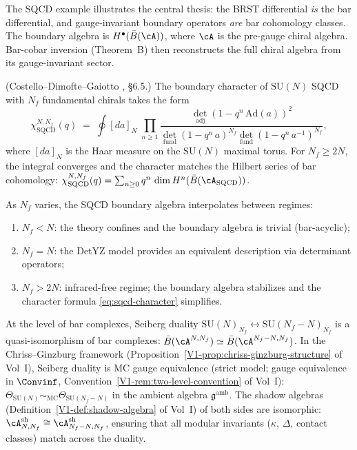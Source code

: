 \begin{remark}
The SQCD example illustrates the central thesis: the BRST differential
\emph{is} the bar differential, and gauge-invariant boundary operators
\emph{are} bar cohomology classes. The boundary algebra is
$H^\bullet(\bar{B}(\cA))$, where $\cA$ is the pre-gauge chiral algebra.
Bar-cobar inversion (Theorem~B) then reconstructs the full chiral
algebra from its gauge-invariant sector.
\end{remark}

\begin{example}
\textup{(Costello--Dimofte--Gaiotto \cite{CDG2023}, \S6.5.)}
The boundary character of $\mathrm{SU}(N)$ SQCD with $N_f$
fundamental chirals takes the form
\begin{equation}%
 \chi_{\mathrm{SQCD}}^{N,N_f}(q)
 \;=\;
 \oint [da]_{N}\;
 \prod_{n \geq 1}
 \frac{\det_{\mathrm{adj}}(1 - q^n\,\mathrm{Ad}(a))^2}
 {\det_{\mathrm{fund}}(1-q^n\,a)^{N_f}
 \det_{\mathrm{fund}}(1-q^n\,a^{-1})^{N_f}},
\end{equation}
where $[da]_N$ is the Haar measure on the $\mathrm{SU}(N)$ maximal
torus. For $N_f \geq 2N$, the integral converges and the character
matches the Hilbert series of bar cohomology:
$\chi_{\mathrm{SQCD}}^{N,N_f}(q) = \sum_{n \geq 0} q^n\,\dim
H^n(\bar{B}(\cA_{\mathrm{SQCD}}))$.
\end{example}

\begin{remark}
As $N_f$ varies, the SQCD boundary algebra interpolates between
regimes:
\begin{enumerate}[label=\textup{(\roman*)},nosep]
\item $N_f < N$: the theory confines and the boundary algebra is
 trivial (bar-acyclic);
\item $N_f = N$: the DetYZ model provides an equivalent
 description via determinant operators;
\item $N_f > 2N$: infrared-free regime; the boundary algebra
 stabilizes and the character formula
 \eqref{eq:sqcd-character} simplifies.
\end{enumerate}
At the level of bar complexes, Seiberg duality
$\mathrm{SU}(N)_{N_f} \leftrightarrow \mathrm{SU}(N_f - N)_{N_f}$
is a quasi-isomorphism of bar complexes:
$\bar{B}(\cA^{N,N_f}) \simeq \bar{B}(\cA^{N_f-N,N_f})$. In the
Chriss--Ginzburg framework
(Proposition~\ref*{V1-prop:chriss-ginzburg-structure} of Vol~I), Seiberg
duality is MC gauge equivalence
(strict model; gauge equivalence in $\Convinf$, Convention~\ref*{V1-rem:two-level-convention} of Vol~I):
$\Theta_{\mathrm{SU}(N)} \sim_{\mathrm{MC}}
\Theta_{\mathrm{SU}(N_f-N)}$ in the ambient algebra
$\mathfrak{g}^{\mathrm{amb}}$. The shadow algebras
(Definition~\ref*{V1-def:shadow-algebra} of Vol~I) of both sides are
isomorphic: $\cA^{\mathrm{sh}}_{N,N_f} \cong
\cA^{\mathrm{sh}}_{N_f-N,N_f}$, ensuring that all modular
invariants ($\kappa$, $\Delta$, contact classes) match
across the duality.
\end{remark}
